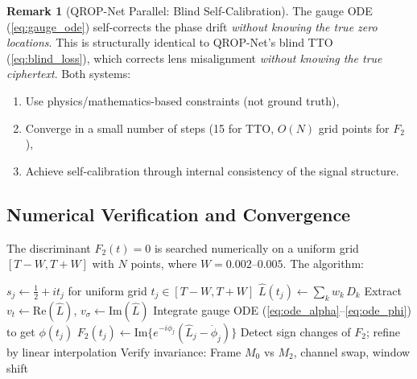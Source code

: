 \documentclass[11pt, a4paper]{article}
\theoremstyle{definition}
\newtheorem{remark}{Remark}[section]
\theoremstyle{plain}
\newcommand{\Lhat}{\hat{L}}                %
\begin{document}
\begin{remark}[QROP-Net Parallel: Blind Self-Calibration]
\label{rem:tto_parallel}
The gauge ODE (\cref{eq:gauge_ode}) self-corrects the phase drift
\textit{without knowing the true zero locations}. This is structurally
identical to QROP-Net's blind TTO (\cref{eq:blind_loss}), which
corrects lens misalignment \textit{without knowing the true ciphertext}.
Both systems:
\begin{enumerate}
  \item Use physics/mathematics-based constraints (not ground truth),
  \item Converge in a small number of steps (15 for TTO, $O(N)$ grid
        points for $F_2$),
  \item Achieve self-calibration through internal consistency of the
        signal structure.
\end{enumerate}
\end{remark}


\subsection{Numerical Verification and Convergence}
\label{sec:polyadic_results}

The discriminant $F_2(t) = 0$ is searched numerically on a uniform grid
$[T-W, T+W]$ with $N$ points, where $W = 0.002$--$0.005$. The algorithm:

\begin{algorithm}[ht]
\DontPrintSemicolon
\caption{Polyadic Zero Detection}
\label{alg:polyadic}
$s_j \gets \tfrac{1}{2} + it_j$ for uniform grid $t_j \in [T-W, T+W]$\;
$\Lhat(t_j) \gets \sum_k w_k\,D_k$\;
Extract $v_t \gets \mathrm{Re}(\Lhat)$,
$v_\sigma \gets \mathrm{Im}(\Lhat)$\;
Integrate gauge ODE (\cref{eq:ode_alpha}--\ref{eq:ode_phi}) to
get $\phi(t_j)$\;
$F_2(t_j) \gets \mathrm{Im}\{e^{-i\phi_j}(\Lhat_j - \dot{\phi}_j)\}$\;
Detect sign changes of $F_2$; refine by linear interpolation\;
Verify invariance: Frame $M_0$ vs $M_2$, channel swap, window shift\;
\end{algorithm}
\end{document}
